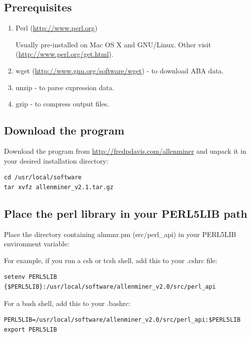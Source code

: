 \documentclass[10pt]{article}
\begin{document}
\subsection{Prerequisites}
\begin{enumerate}\itemsep0pt
\item Perl (\url{http://www.perl.org})

Usually pre-installed on Mac OS X and GNU/Linux. Other visit (\url{http://www.perl.org/get.html}).

\item wget (\url{http://www.gnu.org/software/wget}) - to download ABA data.

\item unzip - to parse expression data.

\item gzip - to compress output files.
\end{enumerate}


\subsection{Download the program}

Download the program from \url{http://fredpdavis.com/allenminer} and unpack it in your desired installation directory:
\lstset{breaklines=true,language=bash}
\lstset{frame=single}
\lstset{basicstyle=\ttfamily}
\begin{lstlisting}
cd /usr/local/software
tar xvfz allenminer_v2.1.tar.gz
\end{lstlisting}


\subsection{Place the perl library in your PERL5LIB path}

Place the directory containing alnmnr.pm (src/perl\_api) in your PERL5LIB environment variable:

For example, if you run a csh or tcsh shell, add this to your .cshrc file:
\begin{lstlisting}
setenv PERL5LIB {$PERL5LIB}:/usr/local/software/allenminer_v2.0/src/perl_api
\end{lstlisting}

For a bash shell, add this to your .bashrc:
\begin{lstlisting}
PERL5LIB=/usr/local/software/allenminer_v2.0/src/perl_api:$PERL5LIB
export PERL5LIB
\end{lstlisting}
\end{document}
